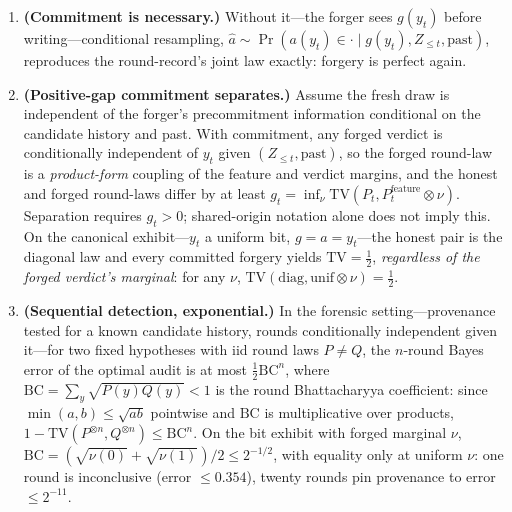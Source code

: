 \begin{thmplain}

\par\nopagebreak

\begin{enumerate}
\def\labelenumi{\arabic{enumi}.}
\tightlist
\item
  \textbf{(Commitment is necessary.)} Without it---\hspace{0pt}the forger sees \(g(y_t)\) before writing---\hspace{0pt}conditional resampling, \(\hat a \sim \Pr(a(y_t)\in\cdot\mid g(y_t),Z_{\le t},\mathrm{past})\), reproduces the round-record's joint law exactly: forgery is perfect again.
\item
  \textbf{(Positive-gap commitment separates.)} Assume the fresh draw is independent of the forger's precommitment information conditional on the candidate history and past. With commitment, any forged verdict is conditionally independent of \(y_t\) given \((Z_{\le t}, \text{past})\), so the forged round-law is a \emph{product-form} coupling of the feature and verdict margins, and the honest and forged round-laws differ by at least \(g_t=\inf_\nu\mathrm{TV}(P_t,P_t^{\mathrm{feature}}\otimes\nu)\). Separation requires \(g_t>0\); shared-origin notation alone does not imply this. On the canonical exhibit---\hspace{0pt}\(y_t\) a uniform bit, \(g = a = y_t\)---\hspace{0pt}the honest pair is the diagonal law and every committed forgery yields \(\mathrm{TV} = \tfrac12\), \emph{regardless of the forged verdict's marginal}: for any \(\nu\), \(\mathrm{TV}(\mathrm{diag}, \mathrm{unif} \otimes \nu) = \tfrac12\).
\item
  \textbf{(Sequential detection, exponential.)} In the forensic setting---\hspace{0pt}provenance tested for a known candidate history, rounds conditionally independent given it---\hspace{0pt}for two fixed hypotheses with iid round laws \(P\ne Q\), the \(n\)-round Bayes error of the optimal audit is at most \(\tfrac12 \mathrm{BC}^n\), where \(\mathrm{BC} = \sum_y \sqrt{P(y)Q(y)} < 1\) is the round Bhattacharyya coefficient: since \(\min(a,b) \le \sqrt{ab}\) pointwise and \(\mathrm{BC}\) is multiplicative over products, \(1 - \mathrm{TV}(P^{\otimes n}, Q^{\otimes n}) \le \mathrm{BC}^n\). On the bit exhibit with forged marginal \(\nu\), \(\mathrm{BC}=(\sqrt{\nu(0)}+\sqrt{\nu(1)})/2\le2^{-1/2}\), with equality only at uniform \(\nu\): one round is inconclusive (error \(\le 0.354\)), twenty rounds pin provenance to error \(\le 2^{-11}\).
\end{enumerate}
\end{thmplain}

